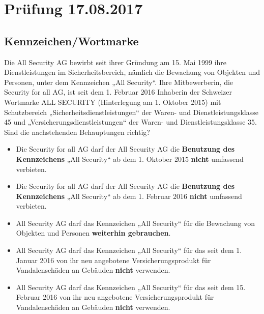 \section{Prüfung 17.08.2017}

\subsection{Kennzeichen/Wortmarke}
Die All Security AG bewirbt seit ihrer Gründung am 15. Mai 1999 ihre Dienstleistungen im Sicherheitsbereich, nämlich die Bewachung von Objekten und Personen, unter dem Kennzeichen „All Security“. Ihre Mitbewerberin, die Security for all AG, ist seit dem 1. Februar 2016 Inhaberin der Schweizer Wortmarke ALL SECURITY (Hinterlegung am 1. Oktober 2015) mit Schutzbereich „Sicherheitsdienstleistungen“ der Waren- und Dienstleistungsklasse 45 und „Versicherungsdienstleistungen“ der Waren- und Dienstleistungsklasse 35. Sind die nachstehenden Behauptungen richtig?
\begin{itemize}
	\item Die Security for all AG darf der All Security AG die \textbf{Benutzung des Kennzeichens} „All Security“ ab dem 1. Oktober 2015 \textbf{nicht} umfassend verbieten.
	\item Die Security for all AG darf der All Security AG die \textbf{Benutzung des Kennzeichens} „All Security“ ab dem 1. Februar 2016 \textbf{nicht} umfassend verbieten.
	\item All Security AG darf das Kennzeichen „All Security“ für die Bewachung von Objekten und Personen \textbf{weiterhin gebrauchen}.
	\item All Security AG darf das Kennzeichen „All Security“ für das seit dem 1. Januar 2016 von ihr neu angebotene Versicherungsprodukt für Vandalenschäden an Gebäuden \textbf{nicht} verwenden.
	\item All Security AG darf das Kennzeichen „All Security“ für das seit dem 15. Februar 2016 von ihr neu angebotene Versicherungsprodukt für Vandalenschäden an Gebäuden \textbf{nicht} verwenden.
\end{itemize}

